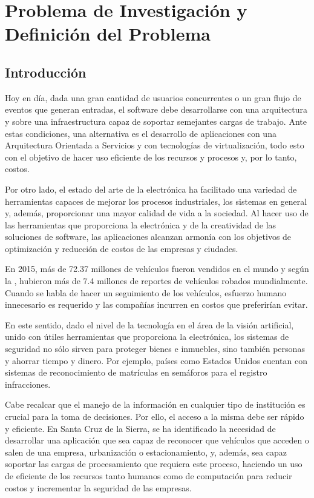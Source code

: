 \chapter{Problema de Investigación y Definición del Problema}
\section{Introducción}

    Hoy en día, dada una gran cantidad de usuarios concurrentes o un gran flujo de eventos que generan entradas, el software debe desarrollarse con una arquitectura y sobre una infraestructura capaz de soportar semejantes cargas de trabajo. Ante estas condiciones, una alternativa es el desarrollo de aplicaciones con una Arquitectura Orientada a Servicios y con tecnologías de virtualización, todo esto con el objetivo de hacer uso eficiente de los recursos y procesos y, por lo tanto, costos.
    
    Por otro lado, el estado del arte de la electrónica ha facilitado una variedad de herramientas capaces de mejorar los procesos industriales, los sistemas en general y, además, proporcionar una mayor calidad de vida a la sociedad. Al hacer uso de las herramientas que proporciona la electrónica y de la creatividad de las soluciones de software, las aplicaciones alcanzan armonía con los objetivos de optimización y reducción de costos de las empresas y ciudades. 
    
    En 2015, más de 72.37 millones de vehículos fueron vendidos en el mundo \cite{Statista2016-qw} y según la , hubieron más de 7.4 millones de reportes de vehículos robados mundialmente. Cuando se habla de hacer un seguimiento de los vehículos, esfuerzo humano innecesario es requerido y las compañías incurren en costos que preferirían evitar.
    
    En este sentido, dado el nivel de la tecnología en el área de la visión artificial, unido con útiles herramientas que proporciona la electrónica, los sistemas de seguridad no sólo sirven para proteger bienes e inmuebles, sino también personas y ahorrar tiempo y dinero. Por ejemplo, países como Estados Unidos cuentan con sistemas de reconocimiento de matrículas en semáforos para el registro infracciones. 
    
    Cabe recalcar que el manejo de la información en cualquier tipo de institución es crucial para la toma de decisiones. Por ello, el acceso a la misma debe ser rápido y eficiente. En Santa Cruz de la Sierra, se ha identificado la necesidad de desarrollar una aplicación que sea capaz de reconocer que vehículos que acceden o salen de una empresa, urbanización o estacionamiento, y, además, sea capaz soportar las cargas de procesamiento que requiera este proceso, haciendo un uso de eficiente de los recursos tanto humanos como de computación para reducir costos y incrementar la seguridad de las empresas.
